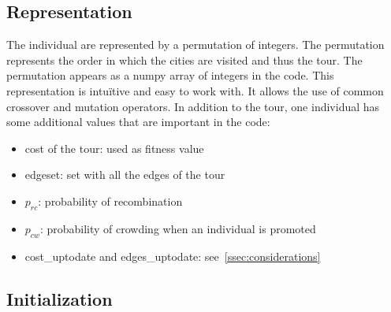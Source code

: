 \documentclass[a4paper,10pt]{article}
\newcommand{\ReplaceMe}[1]{{\color{blue}#1}}
\newcommand{\RemoveMe}[1]{{\color{purple}#1}}
\begin{document}


\subsection{Representation}\label{ssec:representation}

The individual are represented by a permutation of integers. The permutation represents the order in which the cities are visited and thus the tour. The permutation appears as a numpy array of integers in the code. This representation is intu\"itive and easy to work with. It allows the use of common crossover and mutation operators. In addition to the tour, one individual has some additional values that are important in the code:
\begin{itemize}
  \item cost of the tour: used as fitness value
  \item edgeset: set with all the edges of the tour
  \item $p_{rc}$: probability of recombination
  \item $p_{cw}$: probability of crowding when an individual is promoted
  \item cost\_uptodate and edges\_uptodate: see~\ref{ssec:considerations}  
\end{itemize}

\subsection{Initialization}\label{ssec:initialization}
\end{document}
